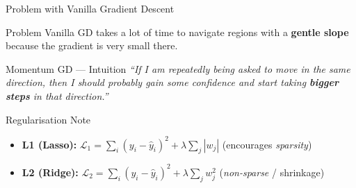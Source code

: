\documentclass{beamer}
\begin{document}
\begin{frame}[shrink=10]{Problem with Vanilla Gradient Descent}
  \begin{alertblock}{Problem}
    Vanilla GD takes a lot of time to navigate regions with a
    \textbf{gentle slope} because the gradient is very small there.
  \end{alertblock}

  \bigskip

  \begin{block}{Momentum GD --- Intuition}
    \textit{``If I am repeatedly being asked to move in the same direction,
    then I should probably gain some confidence and start taking
    \textbf{bigger steps} in that direction.''}
  \end{block}

  \bigskip

  \begin{block}{Regularisation Note}
    \begin{itemize}\setlength\itemsep{6pt}
      \item \textbf{L1 (Lasso):}
            $\mathcal{L}_1 = \displaystyle\sum_{i}(y_i-\hat{y}_i)^2
            + \lambda\sum_j|w_j|$ \quad (encourages \emph{sparsity})
      \item \textbf{L2 (Ridge):}
            $\mathcal{L}_2 = \displaystyle\sum_{i}(y_i-\hat{y}_i)^2
            + \lambda\sum_j w_j^2$ \quad (\emph{non-sparse} / shrinkage)
    \end{itemize}
  \end{block}
\end{frame}
\end{document}
